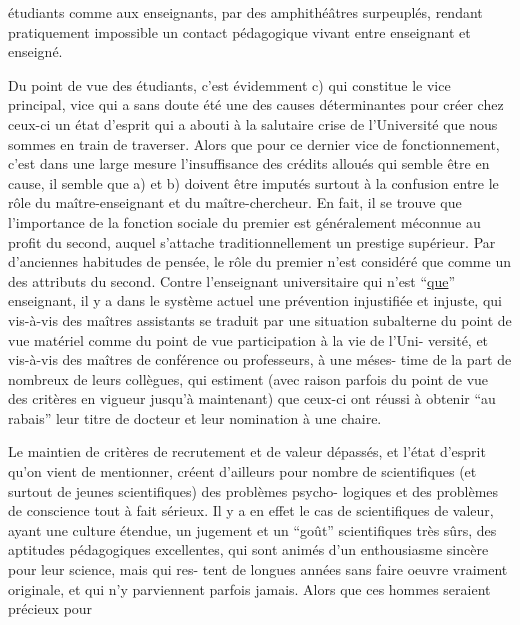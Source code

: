 
étudiants comme aux enseignants, par des amphithéâtres surpeuplés, rendant
pratiquement impossible un contact pédagogique vivant entre enseignant et
enseigné.

Du point de vue des étudiants, c'est évidemment c) qui constitue
le vice principal, vice qui a sans doute été une des causes déterminantes
pour créer chez ceux-ci un état d'esprit qui a abouti à la salutaire crise
de l'Université que nous sommes en train de traverser. Alors que pour ce
dernier vice de fonctionnement, c'est dans une large mesure l'insuffisance
des crédits alloués qui semble être en cause, il semble que a) et b) doivent
être imputés surtout à la confusion entre le rôle du maître-enseignant et du
maître-chercheur. En fait, il se trouve que l'importance de la fonction
sociale du premier est généralement méconnue au profit du second, auquel
s'attache traditionnellement un prestige supérieur. Par d'anciennes habitudes
de pensée, le rôle du premier n'est considéré que comme un des attributs du
second. Contre l'enseignant universitaire qui n'est ``\uline{que}'' enseignant, il
y a dans le système actuel une prévention injustifiée et injuste, qui
vis-à-vis des maîtres assistants se traduit par une situation subalterne du
point de vue matériel comme du point de vue participation à la vie de l'Uni-%
versité, et vis-à-vis des maîtres de conférence ou professeurs, à une méses-%
time de la part de nombreux de leurs collègues, qui estiment (avec raison
parfois du point de vue des critères en vigueur jusqu'à maintenant) que
ceux-ci ont réussi à obtenir ``au rabais'' leur titre de docteur et leur
nomination à une chaire.

Le maintien de critères de recrutement et de valeur dépassés, et
l'état d'esprit qu'on vient de mentionner, créent d'ailleurs pour nombre
de scientifiques (et surtout de jeunes scientifiques) des problèmes psycho-%
logiques et des problèmes de conscience tout à fait sérieux. Il y a en effet
le cas de scientifiques de valeur, ayant une culture étendue, un jugement
et un ``goût'' scientifiques très sûrs, des aptitudes pédagogiques excellentes,
qui sont animés d'un enthousiasme sincère pour leur science, mais qui res-%
tent de longues années sans faire oeuvre vraiment originale, et qui n'y
parviennent parfois jamais. Alors que ces hommes seraient précieux pour

